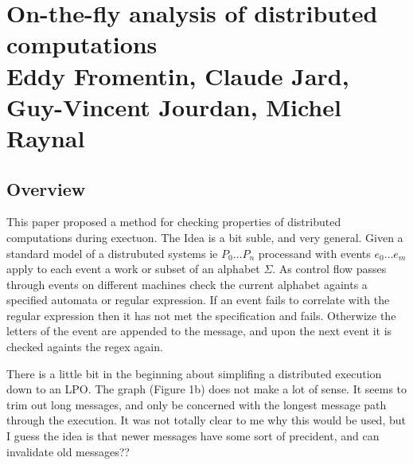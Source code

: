 \section{On-the-fly analysis of distributed computations \\
\small{Eddy Fromentin, Claude Jard, Guy-Vincent Jourdan, Michel Raynal}}

\subsection{Overview}

This paper proposed a method for checking properties of distributed
computations during exectuon. The Idea is a bit suble, and very general. Given
a standard model of a distrubuted systems ie $P_0 \dots P_n$ processand with
events $e_0 \dots e_m$ apply to each event a work or subset of an alphabet
$\Sigma$. As control flow passes through events on different machines check the
current alphabet againts a specified automata or regular expression. If an
event fails to correlate with the regular expression then it has not met the
specification and fails. Otherwize the letters of the event are appended to the
message, and upon the next event it is checked againts the regex again.

There is a little bit in the beginning about simplifing a distributed execution
down to an LPO. The graph (Figure 1b) does not make a lot of sense. It seems to
trim out long messages, and only be concerned with the longest message path
through the execution. It was not totally clear to me why this would be used,
but I guess the idea is that newer messages have some sort of precident, and
can invalidate old messages??



